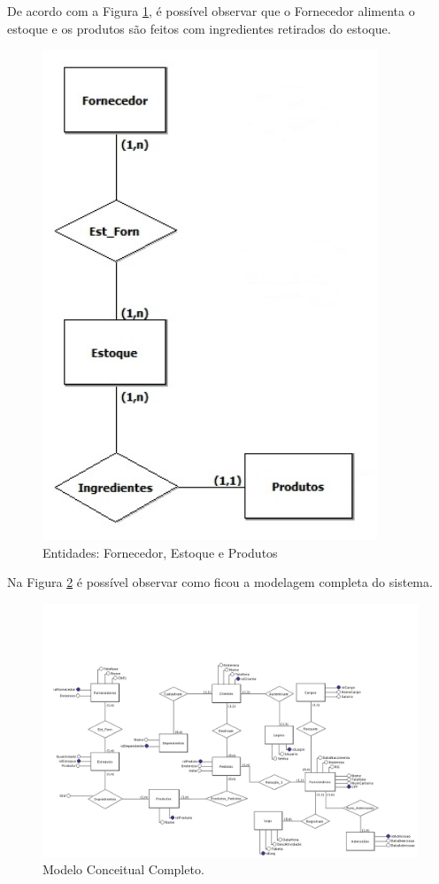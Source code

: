 \documentclass[
	12pt,				%
	openright,			%
	oneside,			%
	a4paper,			%
	chapter=TITLE,		%
	section=TITLE,		%
	english,			%
	brazil				%
	]{abntex2}
\begin{document}
    \newpage

    De acordo com a Figura \ref{mc_03}, é possível observar que o 
    Fornecedor alimenta o estoque e os produtos são feitos com ingredientes 
    retirados do estoque.
    \begin{figure}[h]
         \centering
         \includegraphics[width=10cm,keepaspectratio]{Imgs/MC_03}
         \caption{Entidades: Fornecedor, Estoque e Produtos}
         \label{mc_03}
    \end{figure}

    \newpage
    
    Na Figura \ref{mc_00} é possível observar como ficou a modelagem completa 
    do sistema.
    \begin{figure}[h]
         \centering
         \includegraphics[width=20cm,keepaspectratio,angle=90]{Imgs/MC_00}
         \caption{Modelo Conceitual Completo.}
         \label{mc_00}
    \end{figure}    
\end{document}
